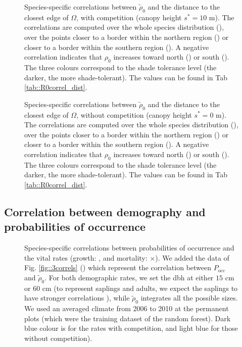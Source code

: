 \documentclass[letterpaper, 12pt]{article}
\newcommand {\s}{{s}^{*}}
\theoremstyle{theo}
\begin{document}
\begin{refsection}
\begin{onehalfspace}
\begin{figure}
	\centering
	
	\caption[$ \text{Cor}(\tilde \rho_0, \text{distance closest edge}) $, $ s^{*} = 10 $ m]{Species-specific correlations between $ \tilde \rho_0 $ and the distance to the closest edge of $ \Omega $, with competition (canopy height $ \s = 10 $ m). The correlations are computed over the whole species distribution (\CircSteel), over the points closer to a border within the northern region (\MoveUp) or closer to a border within the southern region (\MoveDown). A negative correlation indicates that $ \rho_0 $ increases toward north (\MoveUp) or south (\MoveDown). The three colours correspond to the shade tolerance level (the darker, the more shade-tolerant). The values can be found in Tab \ref{tab::R0correl_dist}. \label{fig::3correls_dist}}
\end{figure}

\begin{figure}
	\centering
	
	\caption[$ \text{Cor}(\tilde \rho_0, \text{distance closest edge}) $, no competition]{Species-specific correlations between $ \tilde \rho_0 $ and the distance to the closest edge of $ \Omega $, without competition (canopy height $ \s = 0 $ m). The correlations are computed over the whole species distribution (\CircSteel), over the points closer to a border within the northern region (\MoveUp) or closer to a border within the southern region (\MoveDown). A negative correlation indicates that $ \rho_0 $ increases toward north (\MoveUp) or south (\MoveDown). The three colours correspond to the shade tolerance level (the darker, the more shade-tolerant). The values can be found in Tab \ref{tab::R0correl_dist}. \label{fig::3correls_dist_0}}
\end{figure}

\subsection{Correlation between demography and probabilities of occurrence}
\begin{figure}
	\centering
	
	\caption[$ P_{\text{occ}} $ vs vital rates, species 1-4]{Species-specific correlations between probabilities of occurrence and the vital rates (growth: \CircSteel, and mortality: $ \times $). We added the data of Fig. \ref{fig::3correls} (\MoveUp) which represent the correlation between $ P_{\text{occ}} $ and $ \tilde \rho_0 $. For both demographic rates, we set the dbh at either $ 15 $ cm or $ 60 $ cm (to represent saplings and adults, we expect the saplings to have stronger correlations \citep{Kunstler2019}), while $ \tilde \rho_0 $ integrates all the possible sizes. We used an averaged climate from 2006 to 2010 at the permanent plots (which were the training dataset of the random forest). Dark blue colour is for the rates with competition, and light blue for those without competition). \label{fig::demog_Pocc1-4}}
\end{figure}


\end{onehalfspace}
\end{refsection}
\end{document}
